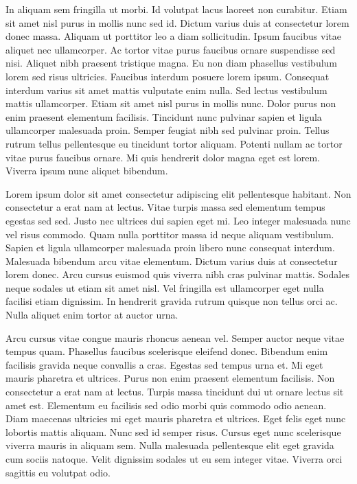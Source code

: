 \documentclass[11pt,a4paper]{article}
\begin{document}
In aliquam sem fringilla ut morbi. Id volutpat lacus laoreet non curabitur. Etiam sit amet nisl purus in mollis nunc sed id. Dictum varius duis at consectetur lorem donec massa. Aliquam ut porttitor leo a diam sollicitudin. Ipsum faucibus vitae aliquet nec ullamcorper. Ac tortor vitae purus faucibus ornare suspendisse sed nisi. Aliquet nibh praesent tristique magna. Eu non diam phasellus vestibulum lorem sed risus ultricies. Faucibus interdum posuere lorem ipsum. Consequat interdum varius sit amet mattis vulputate enim nulla. Sed lectus vestibulum mattis ullamcorper. Etiam sit amet nisl purus in mollis nunc. Dolor purus non enim praesent elementum facilisis. Tincidunt nunc pulvinar sapien et ligula ullamcorper malesuada proin. Semper feugiat nibh sed pulvinar proin. Tellus rutrum tellus pellentesque eu tincidunt tortor aliquam. Potenti nullam ac tortor vitae purus faucibus ornare. Mi quis hendrerit dolor magna eget est lorem. Viverra ipsum nunc aliquet bibendum.

Lorem ipsum dolor sit amet consectetur adipiscing elit pellentesque habitant. Non consectetur a erat nam at lectus. Vitae turpis massa sed elementum tempus egestas sed sed. Justo nec ultrices dui sapien eget mi. Leo integer malesuada nunc vel risus commodo. Quam nulla porttitor massa id neque aliquam vestibulum. Sapien et ligula ullamcorper malesuada proin libero nunc consequat interdum. Malesuada bibendum arcu vitae elementum. Dictum varius duis at consectetur lorem donec. Arcu cursus euismod quis viverra nibh cras pulvinar mattis. Sodales neque sodales ut etiam sit amet nisl. Vel fringilla est ullamcorper eget nulla facilisi etiam dignissim. In hendrerit gravida rutrum quisque non tellus orci ac. Nulla aliquet enim tortor at auctor urna.

Arcu cursus vitae congue mauris rhoncus aenean vel. Semper auctor neque vitae tempus quam. Phasellus faucibus scelerisque eleifend donec. Bibendum enim facilisis gravida neque convallis a cras. Egestas sed tempus urna et. Mi eget mauris pharetra et ultrices. Purus non enim praesent elementum facilisis. Non consectetur a erat nam at lectus. Turpis massa tincidunt dui ut ornare lectus sit amet est. Elementum eu facilisis sed odio morbi quis commodo odio aenean. Diam maecenas ultricies mi eget mauris pharetra et ultrices. Eget felis eget nunc lobortis mattis aliquam. Nunc sed id semper risus. Cursus eget nunc scelerisque viverra mauris in aliquam sem. Nulla malesuada pellentesque elit eget gravida cum sociis natoque. Velit dignissim sodales ut eu sem integer vitae. Viverra orci sagittis eu volutpat odio.
\end{document}
